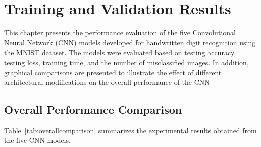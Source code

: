 
\section{Training and Validation Results}

This chapter presents the performance evaluation of the five Convolutional Neural Network (CNN) models developed for handwritten digit recognition using the MNIST dataset. The models were evaluated based on testing accuracy, testing loss, training time, and the number of misclassified images. In addition, graphical comparisons are presented to illustrate the effect of different architectural modifications on the overall performance of the CNN

\subsection{Overall Performance Comparison}

Table~\ref{tab:overallcomparison} summarizes the experimental results obtained from the five CNN models.

\begin{table}[H]
\centering
\caption{Overall Performance Comparison of CNN Models}\label{tab:overallcomparison}


\end{table}

